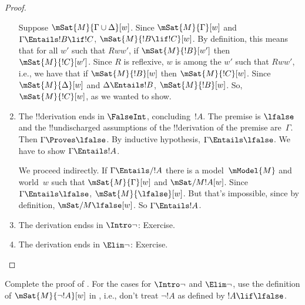 \documentclass[../../../include/open-logic-section]{subfiles}
\begin{document}
\begin{proof}
\begin{enumerate}
    Suppose $\mSat{M}{\Gamma \cup \Delta}[w]$. Since
    $\mSat{M}{\Gamma}[w]$ and $\Gamma \Entails !B \lif !C$,
    $\mSat{M}{!B \lif !C}[w]$. By definition, this means that for all
    $w'$ such that $Rww'$, if $\mSat{M}{!B}[w']$ then
    $\mSat{M}{!C}[w']$. Since $R$ is reflexive, $w$ is among the $w'$
    such that $Rww'$, i.e., we have that if $\mSat{M}{!B}[w]$ then
    $\mSat{M}{!C}[w]$. Since $\mSat{M}{\Delta}[w]$ and $\Delta
    \Entails !B$, $\mSat{M}{!B}[w]$. So, $\mSat{M}{!C}[w]$, as we
    wanted to show.

  \item The !!{derivation} ends in $\FalseInt$, concluding~$!A$. The
    premise is $\lfalse$ and the !!{undischarged} assumptions of the
    !!{derivation} of the premise are~$\Gamma$. Then $\Gamma \Proves
    \lfalse$. By inductive hypothesis, $\Gamma \Entails \lfalse$. We
    have to show $\Gamma \Entails !A$.

    We proceed indirectly. If $\Gamma \Entails/ !A$ there is a
    model~$\mModel{M}$ and world~$w$ such that $\mSat{M}{\Gamma}[w]$
    and $\mSat/{M}{!A}[w]$.  Since $\Gamma \Entails \lfalse$,
    $\mSat{M}{\lfalse}[w]$. But that's impossible, since by
    definition, $\mSat/{M}{\lfalse}[w]$. So $\Gamma \Entails !A$.
  \item The derivation endss in $\Intro\lnot$: Exercise.
  \item The derivation ends in $\Elim\lnot$: Exercise.
  \end{enumerate}
\end{proof}

\begin{prob}
  Complete the proof of . For the
  cases for $\Intro\lnot$ and $\Elim\lnot$, use the definition of
  $\mSat{M}{\lnot !A}[w]$ in , i.e.,
  don't treat $\lnot !A$ as defined by $!A \lif \lfalse$.
\end{prob}
\end{document}
